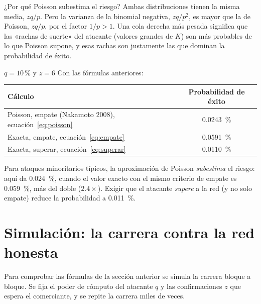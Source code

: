 \documentclass[11pt,a4paper]{article}
\newcommand{\webhint}[1]{}
\begin{document}
\begin{nota}{¿Por qué Poisson subestima el riesgo?}\label{nota:poisson}
Ambas distribuciones tienen la misma media, $zq/p$. Pero la varianza de la binomial negativa, $zq/p^2$, es mayor que la de Poisson, $zq/p$, por el factor $1/p>1$. Una cola derecha más pesada significa que las «rachas de suerte» del atacante (valores grandes de $K$) son más probables de lo que Poisson supone, y esas rachas son justamente las que dominan la probabilidad de éxito.
\end{nota}

\begin{ejemplo}{$q=10\,\%$ y $z=6$}\label{ej:q10z6}
Con las fórmulas anteriores:
\begin{center}
\small
\begin{tabular}{@{}lc@{}}
\toprule
\textbf{Cálculo} & \textbf{Probabilidad de éxito}\\
\midrule
Poisson, empate (Nakamoto 2008), ecuación~\eqref{eq:poisson} & \SI{0.0243}{\percent}\\
Exacta, empate, ecuación~\eqref{eq:empate} & \SI{0.0591}{\percent}\\
Exacta, superar, ecuación~\eqref{eq:superar} & \SI{0.0110}{\percent}\\
\bottomrule
\end{tabular}
\end{center}
Para ataques minoritarios típicos, la aproximación de Poisson \emph{subestima} el riesgo: aquí da \SI{0.024}{\percent}, cuando el valor exacto con el mismo criterio de empate es \SI{0.059}{\percent}, más del doble ($2.4\times$). Exigir que el atacante \emph{supere} a la red (y no solo empate) reduce la probabilidad a \SI{0.011}{\percent}.
\end{ejemplo}

\section{Simulación: la carrera contra la red honesta}\label{sec:simulacion}
\webhint{section; id=sec-simulacion; slug=simulacion-de-la-carrera; kicker=10 — comprobándolo; role=narrative+widget}

Para comprobar las fórmulas de la sección anterior se simula la carrera bloque a bloque. Se fija el poder de cómputo del atacante $q$ y las confirmaciones $z$ que espera el comerciante, y se repite la carrera miles de veces.
\end{document}

